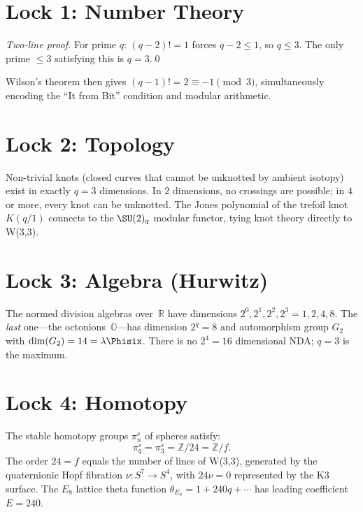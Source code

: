 \section{Lock 1: Number Theory}

\begin{proof}[Two-line proof]
For prime $q$: $(q{-}2)!=1$ forces $q-2 \leq 1$, so $q \leq 3$.
The only prime $\leq 3$ satisfying this is $q=3$.\qed
\end{proof}

Wilson's theorem then gives $(q{-}1)! = 2 \equiv -1 \pmod{3}$,
simultaneously encoding the ``It from Bit'' condition and modular arithmetic.


\section{Lock 2: Topology}

Non-trivial knots (closed curves that cannot be unknotted by ambient isotopy)
exist in exactly $q=3$ dimensions.
In $2$ dimensions, no crossings are possible; in $4$ or more,
every knot can be unknotted. The Jones polynomial of the trefoil knot
$K(q/1)$ connects to the $\SU(2)_q$ modular functor, tying knot theory
directly to W(3,3).


\section{Lock 3: Algebra (Hurwitz)}

The normed division algebras over~$\mathbb{R}$ have dimensions
$2^0, 2^1, 2^2, 2^3 = 1,2,4,8$.
The \emph{last} one---the octonions~$\mathbb{O}$---has dimension $2^q=8$
and automorphism group $G_2$ with $\dim(G_2) = 14 = \lambda\Phisix$.
There is no $2^4=16$ dimensional NDA; $q=3$ is the maximum.


\section{Lock 4: Homotopy}

The stable homotopy groups $\pi_n^s$ of spheres satisfy:
\begin{equation}
\pi_q^s = \pi_3^s = \mathbb{Z}/24 = \mathbb{Z}/f.
\end{equation}
The order $24 = f$ equals the number of lines of W(3,3),
generated by the quaternionic Hopf fibration $\nu:S^7\to S^4$,
with $24\nu = 0$ represented by the K3 surface.
The $E_8$ lattice theta function $\theta_{E_8} = 1 + 240q + \cdots$
has leading coefficient $E = 240$.


